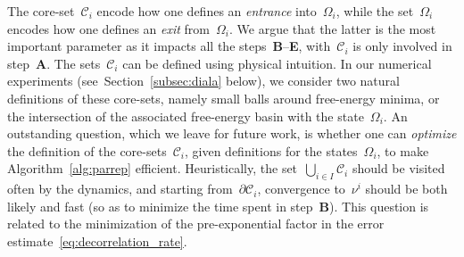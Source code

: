 \documentclass[a4]{article}
\newcommand{\1}{\mathbbm 1}
\begin{document}
    The core-set~$\mathcal C_i$ encode how one defines an \textit{entrance} into~$\Omega_i$, while the set~$\Omega_i$ encodes how one defines an \textit{exit} from~$\Omega_i$. We argue that the latter is the most important parameter as it impacts all the steps~{\bf B}--{\bf E}, with~$\mathcal C_i$ is only involved in step~{\bf{A}}. The sets~$\mathcal C_i$ can be defined using physical intuition. In our numerical experiments (see~Section~\ref{subsec:diala} below), we consider two natural definitions of these core-sets, namely small balls around free-energy minima, or the intersection of the associated free-energy basin with the state~$\Omega_i$.
    An outstanding question, which we leave for future work, is whether one can \textit{optimize} the definition of the core-sets~$\mathcal C_i$, given definitions for the states~$\Omega_i$, to make Algorithm~\ref{alg:parrep} efficient. Heuristically, the set~$\bigcup_{i\in I}\mathcal C_i$ should be visited often by the dynamics, and starting from~$\partial\mathcal C_i$, convergence to~$\nu^i$ should be both likely and fast (so as to minimize the time spent in step~{\bf B}). This question is related to the minimization of the pre-exponential factor in the error estimate~\eqref{eq:decorrelation_rate}.
\end{document}

